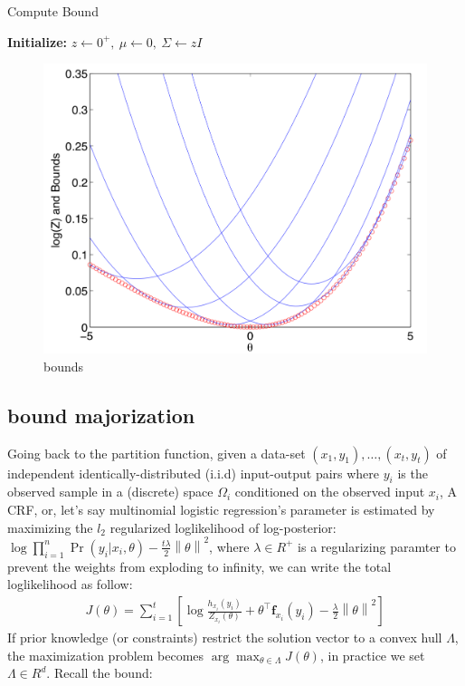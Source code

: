 \documentclass{article}
\begin{document}
 \begin{algorithm}[H]
  \caption{Compute Bound}
  \textbf{Initialize:} $z \leftarrow 0^{+},\ \mu\leftarrow 0,\ \Sigma\leftarrow zI$\;    
  \label{algorithm1}
  \end{algorithm}
  \begin{figure}
    \centering
    \includegraphics[width = .45\textwidth]{bound.png}
    \caption{bounds}
    \label{bounds}
  \end{figure}

\subsection{bound majorization}
Going back to the partition function, given a data-set ${(x_1, y_1), \ldots , (x_t, y_t)} $
of independent identically-distributed (i.i.d) input-output pairs where $y_i$ is the observed 
sample in a (discrete) space $\Omega_i$ conditioned on the observed input $x_i$, A CRF, or, let's say multinomial logistic regression's
parameter is estimated by maximizing the $l_2$ regularized loglikelihood of log-posterior: $\log \prod_{i=1}^{n}\Pr(y_i|x_i, \theta) - \frac{t\lambda}{2} \left\lVert\theta \right\lVert^2$,
where $\lambda \in R^+$ is a regularizing paramter to prevent the weights from exploding to infinity, we can write the total loglikelihood as follow:
\begin{equation}
  \begin{aligned}
   J(\theta ) = \sum_{i=1}^{t} [\log \frac{h_{x_i}(y_i)}{Z_{x_i}(\theta)} + \theta^{\top} \textbf{f}_{x_i}(y_i) - \frac{\lambda}{2} \left\lVert\theta \right\lVert^2 ]
  \end{aligned}
 \end{equation} 
 If prior knowledge (or constraints) restrict the solution vector to a convex hull $\Lambda$, the maximization
 problem becomes $ \arg \max_{\theta \in \Lambda} J (\theta)$, in practice we set $\Lambda \in R^d$. Recall the bound:
 
\end{document}
